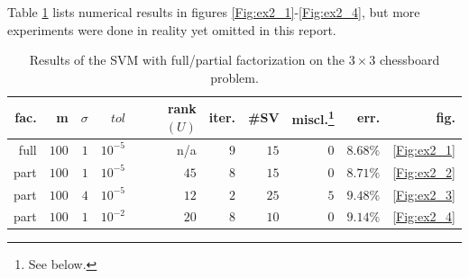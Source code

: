 \documentclass[11pt,a4paper]{article}
\theoremstyle{definition}
\begin{document}
      Table \ref{Tab:ex2} lists numerical results in figures \ref{Fig:ex2_1}-\ref{Fig:ex2_4}, but more experiments were done in reality yet omitted in this report.
        \begin{savenotes}\begin{table}[htbp]
          \centering
            \begin{tabular}{rrrr|rrrrr|r}
            \toprule
            fac.  & m       & $\sigma$ & $tol$     & rank$(U)$  & iter.   & \#SV    & miscl.\footnote{See below.} & err.      & fig. \\
            \midrule
            full  & $100$   & $1$      & $10^{-5}$ & n/a        & $9$     & $15$    & $0$     & $8.68\%$  & \ref{Fig:ex2_1} \\
            part  & $100$   & $1$      & $10^{-5}$ & $45$       & $8$     & $15$    & $0$     & $8.71\%$  & \ref{Fig:ex2_2} \\
            part  & $100$   & $4$      & $10^{-5}$ & $12$       & $2$     & $25$    & $5$     & $9.48\%$  & \ref{Fig:ex2_3} \\
            part  & $100$   & $1$      & $10^{-2}$ & $20$       & $8$     & $10$    & $0$     & $9.14\%$  & \ref{Fig:ex2_4} \\
            \bottomrule
            \end{tabular}%
          \caption{Results of the SVM with full/partial factorization on the $3\times 3$ chessboard problem.}
          \label{Tab:ex2}%
        \end{table}\end{savenotes}%
\end{document}
